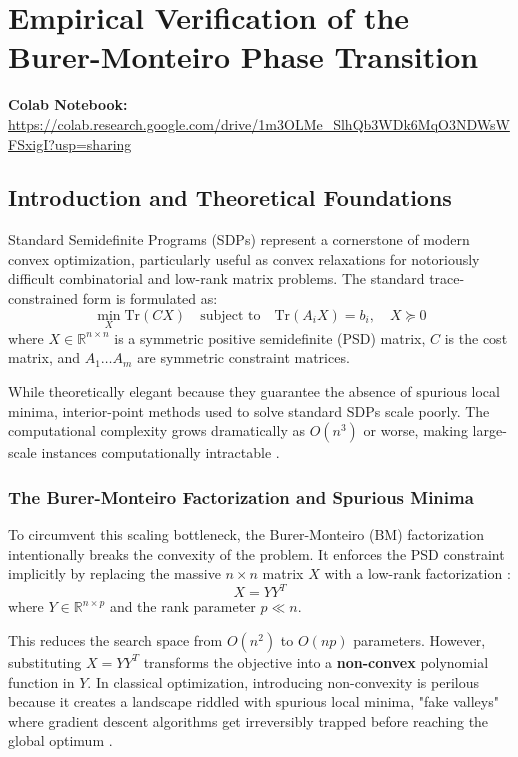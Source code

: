 
\section{Empirical Verification of the Burer-Monteiro Phase Transition}

\textbf{Colab Notebook:} \url{https://colab.research.google.com/drive/1m3OLMe_SlhQb3WDk6MqO3NDWsWFSxigI?usp=sharing}

\subsection{Introduction and Theoretical Foundations}
Standard Semidefinite Programs (SDPs) represent a cornerstone of modern convex optimization, particularly useful as convex relaxations for notoriously difficult combinatorial and low-rank matrix problems. The standard trace-constrained form is formulated as:
\begin{equation}
    \min_{X} \text{Tr}(CX) \quad \text{subject to} \quad \text{Tr}(A_i X) = b_i, \quad X \succeq 0
\end{equation}
where $X \in \mathbb{R}^{n \times n}$ is a symmetric positive semidefinite (PSD) matrix, $C$ is the cost matrix, and $A_1 \dots A_m$ are symmetric constraint matrices. 

While theoretically elegant because they guarantee the absence of spurious local minima, interior-point methods used to solve standard SDPs scale poorly. The computational complexity grows dramatically as $O(n^3)$ or worse, making large-scale instances computationally intractable \cite{sahiner2022scaling}.

\subsubsection{The Burer-Monteiro Factorization and Spurious Minima}
To circumvent this scaling bottleneck, the Burer-Monteiro (BM) factorization intentionally breaks the convexity of the problem. It enforces the PSD constraint implicitly by replacing the massive $n \times n$ matrix $X$ with a low-rank factorization \cite{burer2003nonlinear}:
\begin{equation}
    X = YY^T
\end{equation}
where $Y \in \mathbb{R}^{n \times p}$ and the rank parameter $p \ll n$. 

This reduces the search space from $O(n^2)$ to $O(np)$ parameters. However, substituting $X = YY^T$ transforms the objective into a \textbf{non-convex} polynomial function in $Y$. In classical optimization, introducing non-convexity is perilous because it creates a landscape riddled with spurious local minima, "fake valleys" where gradient descent algorithms get irreversibly trapped before reaching the global optimum \cite{sahiner2022scaling}.

